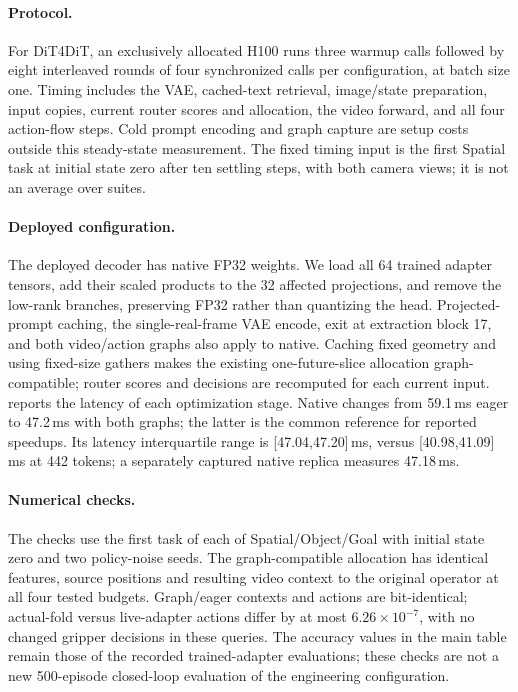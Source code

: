 \paragraph{Protocol.}
For DiT4DiT, an exclusively allocated H100 runs three warmup calls followed by eight interleaved rounds of four synchronized calls per configuration, at batch size one.
Timing includes the VAE, cached-text retrieval, image/state preparation, input copies, current router scores and allocation, the video forward, and all four action-flow steps.
Cold prompt encoding and graph capture are setup costs outside this steady-state measurement.
The fixed timing input is the first Spatial task at initial state zero after ten settling steps, with both camera views; it is not an average over suites.

\paragraph{Deployed configuration.}
The deployed decoder has native FP32 weights.
We load all 64 trained adapter tensors, add their scaled products to the 32 affected projections, and remove the low-rank branches, preserving FP32 rather than quantizing the head.
Projected-prompt caching, the single-real-frame VAE encode, exit at extraction block 17, and both video/action graphs also apply to native.
Caching fixed geometry and using fixed-size gathers makes the existing one-future-slice allocation graph-compatible; router scores and decisions are recomputed for each current input.
 reports the latency of each optimization stage.
Native changes from 59.1\,ms eager to 47.2\,ms with both graphs; the latter is the common reference for reported speedups.
Its latency interquartile range is [47.04,47.20]\,ms, versus [40.98,41.09]\,ms at 442 tokens; a separately captured native replica measures 47.18\,ms.

\paragraph{Numerical checks.}
The checks use the first task of each of Spatial/Object/Goal with initial state zero and two policy-noise seeds.
The graph-compatible allocation has identical features, source positions and resulting video context to the original operator at all four tested budgets.
Graph/eager contexts and actions are bit-identical; actual-fold versus live-adapter actions differ by at most $6.26\times10^{-7}$, with no changed gripper decisions in these queries.
The accuracy values in the main table remain those of the recorded trained-adapter evaluations; these checks are not a new 500-episode closed-loop evaluation of the engineering configuration.

